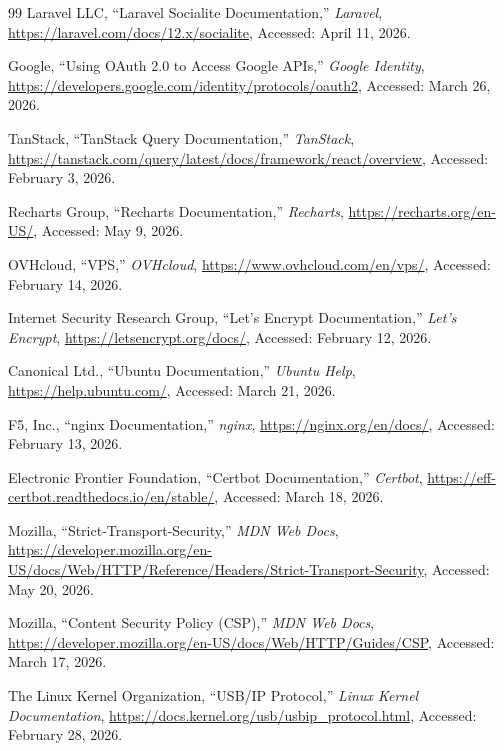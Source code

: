 \begin{thebibliography}{99}
Laravel LLC, ``Laravel Socialite Documentation,'' \textit{Laravel}, \url{https://laravel.com/docs/12.x/socialite}, Accessed: April 11, 2026.

Google, ``Using OAuth 2.0 to Access Google APIs,'' \textit{Google Identity}, \url{https://developers.google.com/identity/protocols/oauth2}, Accessed: March 26, 2026.

TanStack, ``TanStack Query Documentation,'' \textit{TanStack}, \url{https://tanstack.com/query/latest/docs/framework/react/overview}, Accessed: February 3, 2026.

Recharts Group, ``Recharts Documentation,'' \textit{Recharts}, \url{https://recharts.org/en-US/}, Accessed: May 9, 2026.

OVHcloud, ``VPS,'' \textit{OVHcloud}, \url{https://www.ovhcloud.com/en/vps/}, Accessed: February 14, 2026.

Internet Security Research Group, ``Let's Encrypt Documentation,'' \textit{Let's Encrypt}, \url{https://letsencrypt.org/docs/}, Accessed: February 12, 2026.

Canonical Ltd., ``Ubuntu Documentation,'' \textit{Ubuntu Help}, \url{https://help.ubuntu.com/}, Accessed: March 21, 2026.

F5, Inc., ``nginx Documentation,'' \textit{nginx}, \url{https://nginx.org/en/docs/}, Accessed: February 13, 2026.

Electronic Frontier Foundation, ``Certbot Documentation,'' \textit{Certbot}, \url{https://eff-certbot.readthedocs.io/en/stable/}, Accessed: March 18, 2026.

Mozilla, ``Strict-Transport-Security,'' \textit{MDN Web Docs}, \url{https://developer.mozilla.org/en-US/docs/Web/HTTP/Reference/Headers/Strict-Transport-Security}, Accessed: May 20, 2026.

Mozilla, ``Content Security Policy (CSP),'' \textit{MDN Web Docs}, \url{https://developer.mozilla.org/en-US/docs/Web/HTTP/Guides/CSP}, Accessed: March 17, 2026.

The Linux Kernel Organization, ``USB/IP Protocol,'' \textit{Linux Kernel Documentation}, \url{https://docs.kernel.org/usb/usbip_protocol.html}, Accessed: February 28, 2026.

\end{thebibliography}

\cleardoublepage